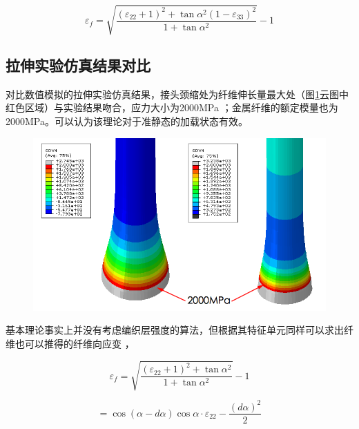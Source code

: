 \begin{equation}
\label{eq:fiber-elongation}
{\varepsilon _f} = \sqrt {\frac{{{{\left( {{\varepsilon _{22}} + 1} \right)}^2} + \tan {\alpha ^2}{{\left( {1 - {\varepsilon _{33}}} \right)}^2}}}{{1 + \tan {\alpha ^2}}}}  - 1
\end{equation}



\subsection{拉伸实验仿真结果对比}

对比数值模拟的拉伸实验仿真结果，接头颈缩处为纤维伸长量最大处（图\ref{fig:strength}云图中红色区域）与实验结果吻合，应力大小为2000MPa ；金属纤维的额定模量也为2000MPa。可以认为该理论对于准静态的加载状态有效。

\begin{figure}[!htb]
\centering
\emph{}\includegraphics[height=0.25\textheight]{figure/chap6/strength}
\label{fig:strength}
\end{figure}

\ha 基本理论事实上并没有考虑编织层强度的算法，但根据其特征单元同样可以求出纤维也可以推得的纤维向应变 ，

\[{\varepsilon _f} = \sqrt {\frac{{{{\left( {{\varepsilon _{22}} + 1} \right)}^2} + \tan {\alpha ^2}}}{{1 + \tan {\alpha ^2}}}}  - 1\]

\begin{equation}
= \cos \left( {\alpha  - d\alpha } \right)\cos \alpha  \cdot {\varepsilon _{22}} - \frac{{{{\left( {d\alpha } \right)}^2}}}{2}
\end{equation}

